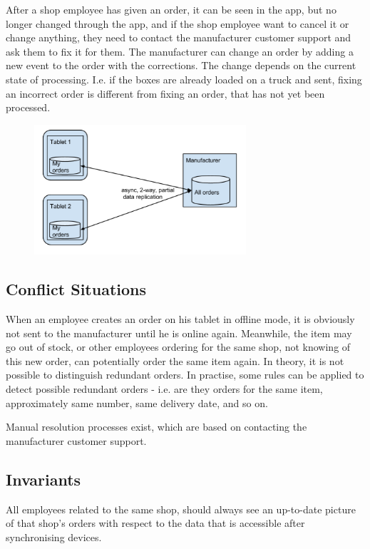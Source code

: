 \documentclass[11pt,a4paper]{report}
\begin{document}
After a shop employee has given an order, it can be seen in the app, but no longer changed through the app, and if the shop employee want to cancel it or change anything, they need to contact the manufacturer customer support and ask them to fix it for them. The manufacturer can change an order by adding a new event to the order with the corrections. The change depends on the current state of processing. I.e. if the boxes are already loaded on a truck and sent, fixing an incorrect order is different from fixing an order, that has not yet been processed.
\begin{figure}[!h]
\centering
\includegraphics[width=0.7\textwidth]{./img/image5.png}
\end{figure}

\subsection{Conflict Situations}

When an employee creates an order on his tablet in offline mode, it is obviously not sent to the manufacturer until he is online again. Meanwhile, the item may go out of stock, or other employees ordering for the same shop, not knowing of this new order, can potentially order the same item again.
In theory, it is not possible to distinguish redundant orders. In practise, some rules can be applied to detect possible redundant orders - i.e. are they orders for the same item, approximately same number, same delivery date, and so on.

Manual resolution processes exist, which are based on contacting the manufacturer customer support.

\subsection{Invariants}
All employees related to the same shop, should always see an up-to-date picture of that shop's orders with respect to the data that is accessible after synchronising devices.
\end{document}
